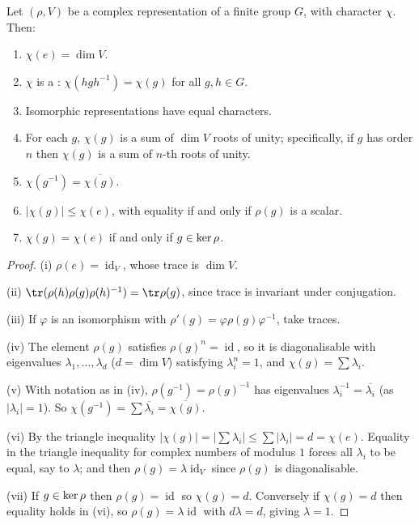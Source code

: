 \documentclass[a4paper]{scrartcl}
\newcommand{\id}{\operatorname{id}}
\begin{document}
\begin{proposition}
	Let $(\rho, V)$ be a complex representation of a finite group $G$, with character $\chi$. Then:
	\begin{enumerate}[label=(\roman*)]
		\item $\chi(e) = \dim V$.
		\item $\chi$ is a : $\chi(hgh^{-1}) = \chi(g)$ for all $g,h \in G$.
		\item Isomorphic representations have equal characters.
		\item For each $g$, $\chi(g)$ is a sum of $\dim V$ roots of unity; specifically, if $g$ has order $n$ then $\chi(g)$ is a sum of $n$-th roots of unity.
		\item $\chi(g^{-1}) = \overline{\chi(g)}$.
		\item $|\chi(g)| \leq \chi(e)$, with equality if and only if $\rho(g)$ is a scalar.
		\item $\chi(g) = \chi(e)$ if and only if $g \in \operatorname{ker}\rho$.
	\end{enumerate}
\end{proposition}
\begin{proof}
	(i) $\rho(e) = \id_V$, whose trace is $\dim V$.

	(ii) $\tr(\rho(h)\rho(g)\rho(h)^{-1}) = \tr \rho(g)$, since trace is invariant under conjugation.

	(iii) If $\varphi$ is an isomorphism with $\rho'(g) = \varphi\rho(g)\varphi^{-1}$, take traces.

	(iv) The element $\rho(g)$ satisfies $\rho(g)^n = \id$, so it is diagonalisable with eigenvalues $\lambda_1, \dots, \lambda_d$ ($d = \dim V$) satisfying $\lambda_i^n = 1$, and $\chi(g) = \sum \lambda_i$.

	(v) With notation as in (iv), $\rho(g^{-1}) = \rho(g)^{-1}$ has eigenvalues $\lambda_i^{-1} = \overline{\lambda_i}$ (as $|\lambda_i| = 1$). So $\chi(g^{-1}) = \sum \overline{\lambda_i} = \overline{\chi(g)}$.

	(vi) By the triangle inequality $|\chi(g)| = |\sum\lambda_i| \leq \sum|\lambda_i| = d = \chi(e)$. Equality in the triangle inequality for complex numbers of modulus $1$ forces all $\lambda_i$ to be equal, say to $\lambda$; and then $\rho(g) = \lambda\id_V$ since $\rho(g)$ is diagonalisable.

	(vii) If $g \in \operatorname{ker}\rho$ then $\rho(g) = \id$ so $\chi(g) = d$. Conversely if $\chi(g) = d$ then equality holds in (vi), so $\rho(g) = \lambda \id$ with $d\lambda = d$, giving $\lambda = 1$.
\end{proof}
\end{document}
